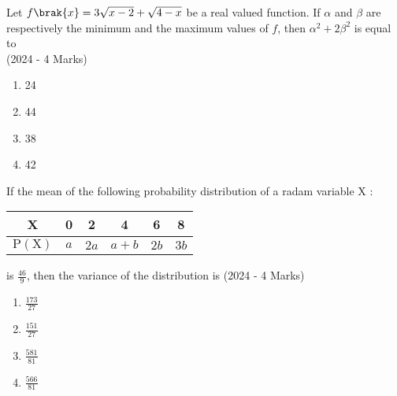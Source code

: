         \item{
        	
        	Let $f\brak{x}=3 \sqrt{x-2}+\sqrt{4-x}$ be a real valued function. If $\alpha$ and $\beta$ are respectively the minimum and the maximum values of $f$, then $\alpha^{2}+2 \beta^{2}$ is equal to\\
        	\text{ }
        	\hfill
        	{(2024 - 4 Marks)}
        	
        	\begin{multicols}{4}
        		\begin{enumerate}
        			\item 24
        			\item 44
        			\item 38
        			\item 42
        		\end{enumerate}
        	\end{multicols}
        	
        }
 	\item{
        	 If the mean of the following probability distribution of a radam variable X :
        	 \begin{center}
	        	\begin{tabular}{|c|c|c|c|c|c|}
	        		\hline X & 0 & 2 & 4 & 6 & 8 \\
	        		\hline $\mathrm{P}(\mathrm{X})$ & $a$ & $2 a$ & $a+b$ & $2 b$ & $3 b$ \\
	        		\hline
	        	\end{tabular}
        	\end{center}
        	is $\frac{46}{9}$, then the variance of the distribution is
        	\hfill
        	{(2024 - 4 Marks)}
        	
        	\begin{multicols}{4}
        		\begin{enumerate}
        			\item $\frac{173}{27}$
        			\item $\frac{151}{27}$
        			\item $\frac{581}{81}$
        			\item $\frac{566}{81}$
        		\end{enumerate}
        	\end{multicols}
        	
        }
 	
